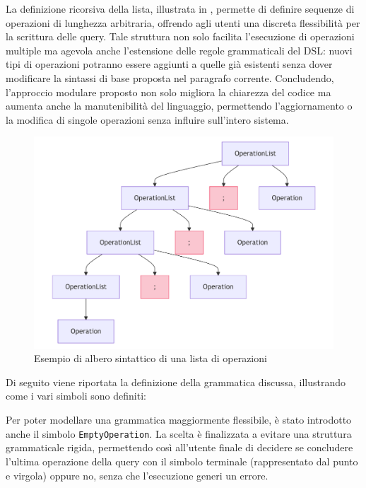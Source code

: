 \documentclass[12pt,a4paper,openright,twoside]{book}
\begin{document}
La definizione ricorsiva della lista, illustrata in , permette di definire sequenze di operazioni di lunghezza 
arbitraria, offrendo agli utenti una discreta flessibilità per la scrittura delle query. Tale struttura non solo facilita 
l’esecuzione di operazioni multiple ma agevola anche l'estensione delle regole grammaticali del DSL: nuovi tipi di operazioni 
potranno essere aggiunti a quelle già esistenti senza dover modificare la sintassi di base proposta nel paragrafo corrente. 
Concludendo, l'approccio modulare proposto non solo migliora la chiarezza del codice ma aumenta anche la manutenibilità del 
linguaggio, permettendo l’aggiornamento o la modifica di singole operazioni senza influire sull’intero sistema.

\begin{figure}
    \centering
    \includegraphics[width=.6\linewidth]{figures/list-ast.pdf}
    \caption{Esempio di albero sintattico di una lista di operazioni}
    \label{fig:list-ast}
\end{figure}

Di seguito viene riportata la definizione della grammatica discussa, illustrando come i vari simboli sono definiti:

Per poter modellare una grammatica maggiormente flessibile, è stato introdotto anche il simbolo \texttt{EmptyOperation}. La scelta 
è finalizzata a evitare una struttura grammaticale rigida, permettendo così all’utente finale di decidere se concludere l’ultima 
operazione della query con il simbolo terminale (rappresentato dal punto e virgola) oppure no, senza che l’esecuzione generi un 
errore.
\end{document}
